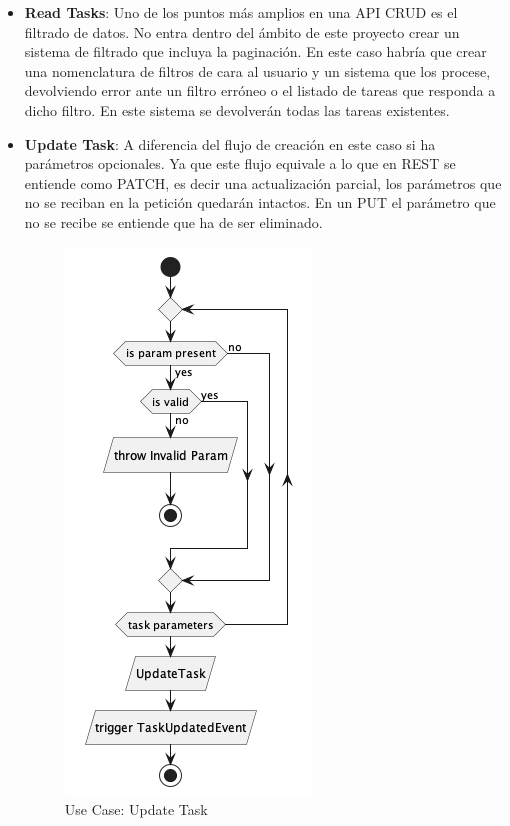 \begin{itemize}
    \item \textbf{Read Tasks}: Uno de los puntos más amplios en una API CRUD es el filtrado de datos.
    No entra dentro del ámbito de este proyecto crear un sistema de filtrado que incluya la paginación.
    En este caso habría que crear una nomenclatura de filtros de cara al usuario y un sistema que los procese, devolviendo error ante un filtro erróneo o el listado de tareas que responda a dicho filtro.
    En este sistema se devolverán todas las tareas existentes.

    \item \textbf{Update Task}: A diferencia del flujo de creación en este caso si ha parámetros opcionales.
    Ya que este flujo equivale a lo que en \gls{REST} se entiende como PATCH, es decir una actualización parcial, los parámetros que no se reciban en la petición quedarán intactos.
    En un PUT el parámetro que no se recibe se entiende que ha de ser eliminado.

    \begin{figure}[H]
        \centering
        \includegraphics[height=0.4\textheight]{./part/Proyecto_ejecutivo/memoria_descriptiva/descripcionDelProyecto/manager/uml/updateTaskUseCase}
        \caption{Use Case: Update Task}\label{fig:Use Case-Update Task}
    \end{figure}


\end{itemize}
